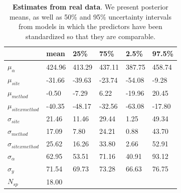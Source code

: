 \documentclass{article}\usepackage[]{graphicx}\usepackage[]{color}
\begin{document}
\begin{table}[ht]
\centering
\caption{\textbf{Estimates from real data}. We present posterior means, as well as 50\% and 95\% uncertainty intervals from models in which the predictors have been standardized so that they are comparable.} 
\label{tab:real}
\begingroup\footnotesize
\begin{tabular}{|p{}|p{}p{}p{}p{}p{}|}
  \hline
 & mean & 25\% & 75\% & 2.5\% & 97.5\% \\ 
  \hline
$\mu_{\alpha}$ & 424.96 & 413.29 & 437.11 & 387.75 & 458.74 \\ 
  $\mu_{site}$ & -31.66 & -39.63 & -23.74 & -54.08 & -9.28 \\ 
  $\mu_{method}$ & -0.50 & -7.29 & 6.22 & -19.96 & 20.45 \\ 
  $\mu_{sitexmethod}$ & -40.35 & -48.17 & -32.56 & -63.08 & -17.80 \\ 
  $\sigma_{site}$ & 21.46 & 11.46 & 29.44 & 1.25 & 49.34 \\ 
  $\sigma_{method}$ & 17.09 & 7.80 & 24.21 & 0.88 & 43.70 \\ 
  $\sigma_{sitexmethod}$ & 25.62 & 16.26 & 33.80 & 2.66 & 52.91 \\ 
  $\sigma_{\alpha}$ & 62.95 & 53.51 & 71.16 & 40.91 & 93.12 \\ 
  $\sigma_{y}$ & 71.54 & 69.73 & 73.28 & 66.63 & 76.75 \\ 
   \hline
$N_{sp}$ & 18.00 &  &  &  &  \\ 
   \hline
\end{tabular}
\endgroup
\end{table}
\end{document}

